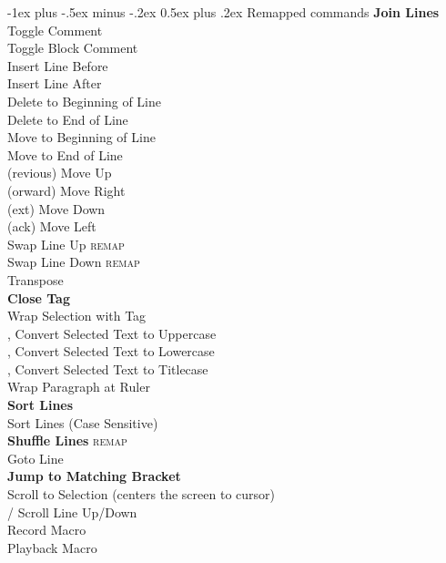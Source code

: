 \documentclass[10pt,landscape]{article}
\makeatletter
\renewcommand{\section}{\@startsection{section}{1}{0mm}%
                                {-1ex plus -.5ex minus -.2ex}%
                                {0.5ex plus .2ex}%
                                {\normalfont\large\bfseries}}
\makeatother
\begin{document}
\begin{multicols}{3}
\section{Remapped commands}
 \textbf{Join Lines} \\
\keys{\cmd+/} Toggle Comment \\
\keys{\cmd+\Alt+/} Toggle Block Comment \\
\keys{\cmd+\shift+\return} Insert Line Before \\
\keys{\cmd+\return} Insert Line After \\
\keys{\cmd+\backspace} Delete to Beginning of Line \\
 Delete to End of Line \\
 Move to Beginning of Line \\
 Move to End of Line \\
(revious) Move Up \\
(orward) Move Right \\
(ext) Move Down \\
(ack) Move Left \\
 Swap Line Up \textsc{remap} \\
 Swap Line Down \textsc{remap} \\
 Transpose \\
 \textbf{Close Tag} \\
 Wrap Selection with Tag \\
,  Convert Selected Text to Uppercase \\
,  Convert Selected Text to Lowercase \\
,  Convert Selected Text to Titlecase \\
 Wrap Paragraph at Ruler \\
 \textbf{Sort Lines} \\
 Sort Lines (Case Sensitive) \\
 \textbf{Shuffle Lines} \textsc{remap} \\
 Goto Line \\
 \textbf{Jump to Matching Bracket} \\
 Scroll to Selection (centers the screen to cursor) \\
\keys{\ctrl+\Alt+\arrowkeyup}/\keys{\arrowkeydown} Scroll Line Up/Down \\
 Record Macro \\
 Playback Macro


\end{multicols}
\end{document}
